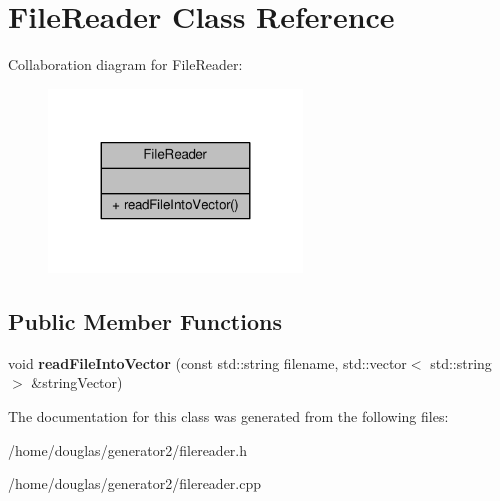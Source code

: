 \hypertarget{classFileReader}{}\section{File\+Reader Class Reference}
\label{classFileReader}


Collaboration diagram for File\+Reader\+:
\nopagebreak
\begin{figure}[H]
\begin{center}
\leavevmode
\includegraphics[width=191pt]{classFileReader__coll__graph}
\end{center}
\end{figure}
\subsection*{Public Member Functions}
\begin{DoxyCompactItemize}
\item 
void {\bfseries read\+File\+Into\+Vector} (const std\+::string filename, std\+::vector$<$ std\+::string $>$ \&string\+Vector)\hypertarget{classFileReader_a2479df28a04c08d003295a5dd0f698d3}{}\label{classFileReader_a2479df28a04c08d003295a5dd0f698d3}

\end{DoxyCompactItemize}


The documentation for this class was generated from the following files\+:\begin{DoxyCompactItemize}
\item 
/home/douglas/generator2/filereader.\+h\item 
/home/douglas/generator2/filereader.\+cpp\end{DoxyCompactItemize}
